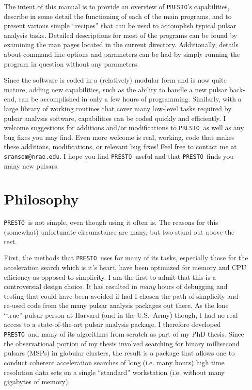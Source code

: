 \documentclass[11pt]{article}
\newcommand{\PRESTO}{{\tt PRESTO}}
\begin{document}
The intent of this manual is to provide an overview of \PRESTO's
capabilities, describe in some detail the functioning of each of the
main programs, and to present various simple ``recipes'' that can be
used to accomplish typical pulsar analysis tasks.  Detailed
descriptions for most of the programs can be found by examining the
man pages located in the current directory.  Additionally, details
about command line options and parameters can be had by simply running
the program in question without any parameters.

Since the software is coded in a (relatively) modular form and is now
quite mature, adding new capabilities, such as the ability to handle a
new pulsar back-end, can be accomplished in only a few hours of
programming.  Similarly, with a large library of working routines that
cover many low-level tasks required by pulsar analysis software,
capabilities can be coded quickly and efficiently.  I welcome
suggestions for additions and/or modifications to \PRESTO\ as well as
any bug fixes you may find.  Even more welcome is real, working, code
that makes these additions, modifications, or relevant bug fixes!
Feel free to contact me at {\tt sransom@nrao.edu}.  I hope you find
\PRESTO\ useful and that \PRESTO\ finds you many new pulsars.

\section{Philosophy}

\PRESTO\ is not simple, even though using it often is.  The reasons
for this (somewhat) unfortunate circumstance are many, but two stand
out above the rest.

First, the methods that \PRESTO\ uses for many of its tasks,
especially those for the acceleration search which is it's heart, have
been optimized for memory and CPU efficiency as opposed to simplicity.
I am the first to admit that this is a controversial design choice.
It has resulted in \emph{many} hours of debugging and testing that
could have been avoided if had I chosen the path of simplicity and
re-used code from the many pulsar analysis packages out there.  As the
lone ``true'' pulsar person at Harvard (and in the U.S.~Army) though,
I had no real access to a state-of-the-art pulsar analysis package.  I
therefore developed \PRESTO\ and many of its algorithms from scratch
as part of my PhD thesis.  Since the observational portion of my
thesis involved searching for binary millisecond pulsars (MSPs) in
globular clusters, the result is a package that allows one to conduct
coherent acceleration searches of long (i.e. many hours) high time
resolution data sets on a single ``standard'' workstation (i.e.
without many gigabytes of memory).
\end{document}
